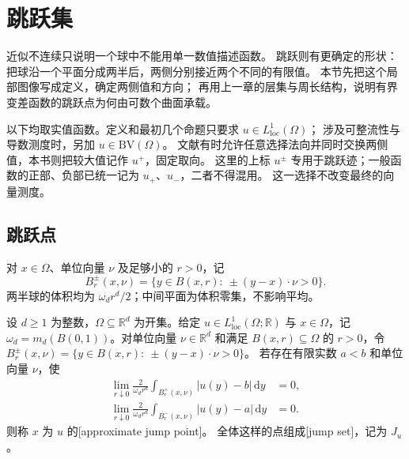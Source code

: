 \section{跳跃集}
\label{b1:sec:2802}

近似不连续只说明一个球中不能用单一数值描述函数。
跳跃则有更确定的形状：把球沿一个平面分成两半后，两侧分别接近两个不同的有限值。
本节先把这个局部图像写成定义，确定两侧值和方向；
再用上一章的层集与周长结构，说明有界变差函数的跳跃点为何由可数个曲面承载。

\ProseParagraphBreak

以下均取实值函数。定义和最初几个命题只要求 \(u\in L^1_{\mathrm{loc}}(\Omega)\)；
涉及可整流性与导数测度时，另加 \(u\in \mathrm{BV}(\Omega)\)。
文献有时允许任意选择法向并同时交换两侧值，本书则把较大值记作 \(u^+\)，固定取向。
这里的上标 \(u^\pm\) 专用于跳跃迹；一般函数的正部、负部已统一记为
\(u_+\)、\(u_-\)，二者不得混用。
这一选择不改变最终的向量测度。


\subsection{跳跃点}
\label{b1:subsec:280201}

对 \(x\in\Omega\)、单位向量 \(\nu\) 及足够小的 \(r>0\)，记
\[
 B_r^\pm(x,\nu)
 =\{y\in B(x,r):\ \pm(y-x)\cdot\nu>0\}.
\]
两半球的体积均为 \(\omega_dr^d/2\)；中间平面为体积零集，不影响平均。

\begin{definition}\label{b1:def:approximate-jump-point}
设 \(d\ge1\) 为整数，\(\Omega\subseteq\mathbb R^d\) 为开集。给定 \(u\in L^1_{\mathrm{loc}}(\Omega;\mathbb R)\) 与 \(x\in\Omega\)，记 \(\omega_d=m_d(B(0,1))\)。对单位向量 \(\nu\in\mathbb R^d\) 和满足 \(B(x,r)\subseteq\Omega\) 的 \(r>0\)，令 \(B_r^\pm(x,\nu)=\{y\in B(x,r):\ \pm(y-x)\cdot\nu>0\}\)。
若存在有限实数 \(a<b\) 和单位向量 \(\nu\)，使
\begin{equation}\label{b1:eq:approximate-jump-halves}
 \begin{aligned}
 \lim_{r\downarrow0}\frac2{\omega_dr^d}
       \int_{B_r^+(x,\nu)}|u(y)-b|\,\mathrm dy&=0,\\
 \lim_{r\downarrow0}\frac2{\omega_dr^d}
       \int_{B_r^-(x,\nu)}|u(y)-a|\,\mathrm dy&=0.
 \end{aligned}
\end{equation}
则称 \(x\) 为 \(u\) 的[approximate jump point]。
全体这样的点组成[jump set]，记为 \(J_u\)。
\end{definition}

